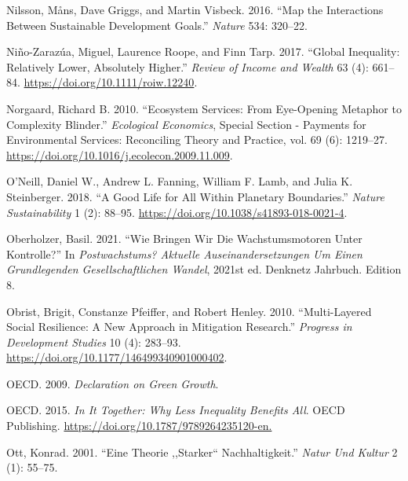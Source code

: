 \documentclass[
  a4paper,
  DIV=11,
  numbers=noendperiod,
  oneside,
  openany]{scrreprt}
\newlength{\cslhangindent}
\newenvironment{CSLReferences}[2] %
 {\begin{list}{}{%
  \setlength{\itemindent}{0pt}
  \setlength{\leftmargin}{0pt}
  \setlength{\parsep}{0pt}
  \ifodd #1
   \setlength{\leftmargin}{\cslhangindent}
   \setlength{\itemindent}{-1\cslhangindent}
  \fi
  \setlength{\itemsep}{#2\baselineskip}}}
 {\end{list}}
\begin{document}
\begin{CSLReferences}{1}{1}
Nilsson, Måns, Dave Griggs, and Martin Visbeck. 2016. {``Map the
Interactions Between {Sustainable Development Goals}.''} \emph{Nature}
534: 320--22.

Niño-Zarazúa, Miguel, Laurence Roope, and Finn Tarp. 2017. {``Global
{Inequality}: {Relatively Lower}, {Absolutely Higher}.''} \emph{Review
of Income and Wealth} 63 (4): 661--84.
\url{https://doi.org/10.1111/roiw.12240}.

Norgaard, Richard B. 2010. {``Ecosystem Services: {From} Eye-Opening
Metaphor to Complexity Blinder.''} \emph{Ecological Economics}, Special
{Section} - {Payments} for {Environmental Services}: {Reconciling
Theory} and {Practice}, vol. 69 (6): 1219--27.
\url{https://doi.org/10.1016/j.ecolecon.2009.11.009}.

O'Neill, Daniel W., Andrew L. Fanning, William F. Lamb, and Julia K.
Steinberger. 2018. {``A Good Life for All Within Planetary
Boundaries.''} \emph{Nature Sustainability} 1 (2): 88--95.
\url{https://doi.org/10.1038/s41893-018-0021-4}.

Oberholzer, Basil. 2021. {``Wie Bringen Wir Die {Wachstumsmotoren} Unter
{Kontrolle}?''} In \emph{Postwachstums? {Aktuelle Auseinandersetzungen}
Um Einen Grundlegenden Gesellschaftlichen {Wandel}}, 2021st ed. Denknetz
{Jahrbuch}. Edition 8.

Obrist, Brigit, Constanze Pfeiffer, and Robert Henley. 2010.
{``Multi-Layered Social Resilience: A New Approach in Mitigation
Research.''} \emph{Progress in Development Studies} 10 (4): 283--93.
\url{https://doi.org/10.1177/146499340901000402}.

OECD. 2009. \emph{Declaration on {Green Growth}}.

OECD. 2015. \emph{In {It Together}: {Why Less Inequality Benefits All}}.
OECD Publishing. \url{https://doi.org/10.1787/9789264235120-en.}

Ott, Konrad. 2001. {``Eine {Theorie} ,,Starker`` {Nachhaltigkeit}.''}
\emph{Natur Und Kultur} 2 (1): 55--75.


\end{CSLReferences}
\end{document}

